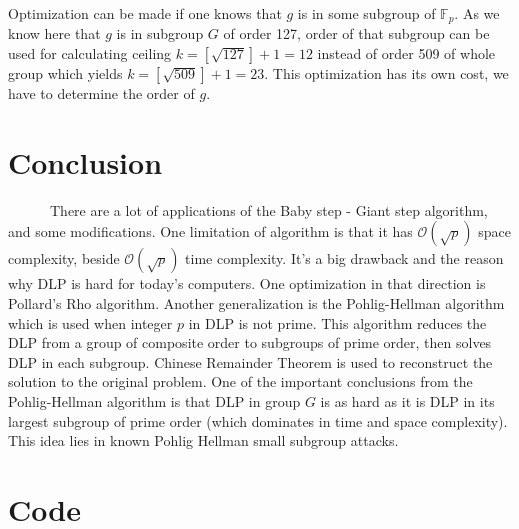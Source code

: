 \documentclass[fleqn,10pt]{olplainarticle}
\begin{document}
Optimization can be made if one knows that $g$ is in some subgroup of $\mathbb{F}_p$. 
As we know here that $g$ is in subgroup $G$ of order 127, order of that subgroup can be used for 
calculating ceiling $k=[\sqrt{127}]+1=12$ instead of order 509 of whole group which 
yields $k=[\sqrt{509}]+1=23$. This optimization has its own cost, we have to determine the order of $g$.

\section*{Conclusion}

\par \ \ \ \ \ \ There are a lot of applications of the Baby step - Giant step algorithm, 
and some modifications. One limitation of algorithm is that it has $\mathcal{O}(\sqrt{p})$ space 
complexity, beside $\mathcal{O}(\sqrt{p})$ time complexity. It's a big drawback and the reason why DLP 
is hard for today's computers. One optimization in that direction is Pollard's Rho algorithm. 
Another generalization is the Pohlig-Hellman algorithm which is used when integer $p$ in DLP 
is not prime. This algorithm reduces the DLP from a group of composite order to subgroups of 
prime order, then solves DLP in each subgroup. Chinese Remainder Theorem is used to reconstruct 
the solution to the original problem. One of the important conclusions from the Pohlig-Hellman 
algorithm is that DLP in group $G$ is as hard as it is DLP in its largest subgroup of prime 
order (which dominates in time and space complexity). This idea lies in known Pohlig Hellman 
small subgroup attacks.

\section*{Code}
\end{document}
